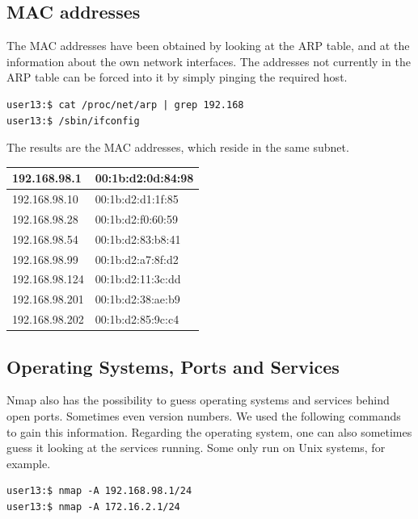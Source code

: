 \documentclass[12pt,a4paper,titlepage,oneside]{scrartcl}
\begin{document}
\subsection{MAC addresses}

The MAC addresses have been obtained by looking at the ARP table, and at the information about the own network interfaces. The addresses not currently in the ARP table can be forced into it by simply pinging the required host.

\begin{lstlisting}[style=simple]
user13:$ cat /proc/net/arp | grep 192.168
user13:$ /sbin/ifconfig
\end{lstlisting}

The results are the MAC addresses, which reside in the same subnet.

\begin{tabular}{l | l}
\hline
192.168.98.1 & 00:1b:d2:0d:84:98 \bigstrut \\ \hline
192.168.98.10 & 00:1b:d2:d1:1f:85 \bigstrut \\ \hline
192.168.98.28 & 00:1b:d2:f0:60:59 \bigstrut \\ \hline
192.168.98.54 & 00:1b:d2:83:b8:41 \bigstrut \\ \hline
192.168.98.99 & 00:1b:d2:a7:8f:d2 \bigstrut \\ \hline
192.168.98.124 & 00:1b:d2:11:3c:dd \bigstrut \\ \hline
192.168.98.201 & 00:1b:d2:38:ae:b9 \bigstrut \\ \hline
192.168.98.202 & 00:1b:d2:85:9c:c4 \bigstrut \\ \hline
\end{tabular}

\newpage
\subsection{Operating Systems, Ports and Services}

Nmap also has the possibility to guess operating systems and services behind open ports. Sometimes even version numbers. We used the following commands to gain this information. Regarding the operating system, one can also sometimes guess it looking at the services running. Some only run on Unix systems, for example.

\begin{lstlisting}[style=simple]
user13:$ nmap -A 192.168.98.1/24
user13:$ nmap -A 172.16.2.1/24
\end{lstlisting}
\end{document}
